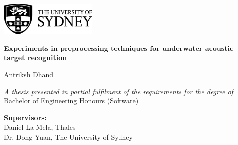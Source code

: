 \begin{titlepage}
    \vspace*{1cm}

    \begin{flushleft}
        \begin{center}
            \includegraphics[width=0.35\textwidth]{img/ch0_frontmatter/usyd_logo_full.png}
    
        \vspace{3cm} 
    
        {\LARGE \textbf{Experiments in preprocessing techniques for underwater acoustic target recognition}}
    
        \vspace{1.5cm} 
        
        {\Large Antriksh Dhand} 


        

        \vfill
        
        \textit{A thesis presented in partial fulfilment of the requirements for the degree of\\[4pt]}
        Bachelor of Engineering Honours (Software)
        
        \vspace{2.75cm}
    
        \textbf{Supervisors:}\\
        Daniel La Mela, Thales\\
        Dr. Dong Yuan, The University of Sydney
    

\end{center}
\end{flushleft}
\end{titlepage}
